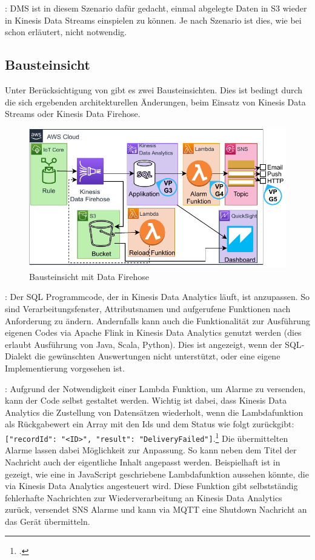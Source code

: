 : \ac{DMS} ist in diesem Szenario dafür gedacht, einmal abgelegte Daten in S3 wieder in Kinesis Data Streams einspielen zu können. Je nach Szenario ist dies, wie bei  schon erläutert, nicht notwendig.

\subsection{Bausteinsicht}
Unter Berücksichtigung von  gibt es zwei Bausteinsichten. Dies ist bedingt durch die sich ergebenden architekturellen Änderungen, beim Einsatz von Kinesis Data Streams oder Kinesis Data Firehose. 

\begin{figure}[H]
\centering
\includegraphics[width=\textwidth]{graphics/Echtzeit-RA-Elements-Firehose.pdf}
\caption{Bausteinsicht mit Data Firehose}
\label{abb:ElementeEchtzeitRA}
\end{figure}

: Der \ac{SQL} Programmcode, der in Kinesis Data Analytics läuft, ist anzupassen. So sind Verarbeitungsfenster, Attributsnamen und aufgerufene Funktionen nach Anforderung zu ändern. Andernfalls kann auch die Funktionalität zur Ausführung eigenen Codes via Apache Flink in Kinesis Data Analytics genutzt werden (dies erlaubt Ausführung von Java, Scala, Python). Dies ist angezeigt, wenn der \ac{SQL}-Dialekt die gewünschten Auswertungen nicht unterstützt, oder eine eigene Implementierung vorgesehen ist.

: Aufgrund der Notwendigkeit einer Lambda Funktion, um Alarme zu versenden, kann der Code selbst gestaltet werden. Wichtig ist dabei, dass Kinesis Data Analytics die Zustellung von Datensätzen wiederholt, wenn die Lambdafunktion als Rückgabewert ein Array mit den Ids und dem Status wie folgt zurückgibt: \texttt{[{"recordId": "<ID>", "result": "DeliveryFailed"}]}.\footcite[Vgl.][]{AmazonWebServicesInc..o.J.ay} Die übermittelten Alarme lassen dabei Möglichkeit zur Anpassung. So kann neben dem Titel der Nachricht auch der eigentliche Inhalt angepasst werden. Beispielhaft ist in  gezeigt, wie eine in JavaScript geschriebene Lambdafunktion aussehen könnte, die via Kinesis Data Analytics angesteuert wird. Diese Funktion gibt selbstständig fehlerhafte Nachrichten zur Wiederverarbeitung an Kinesis Data Analytics zurück, versendet \ac{SNS} Alarme und kann via \ac{MQTT} eine Shutdown Nachricht an das Gerät übermitteln.

